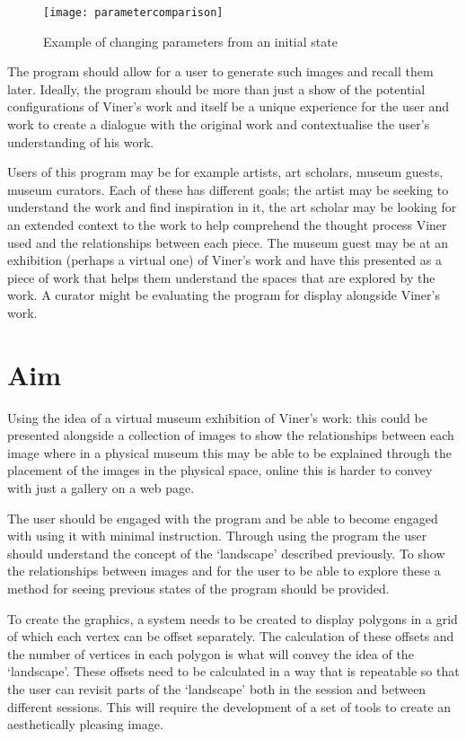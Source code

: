 \begin{figure}[H]
    \centering
    \texttt{[image: parametercomparison]}
    \caption{Example of changing parameters from an initial state}
\end{figure}

The program should allow for a user to generate such images and recall them
later. Ideally, the program should be more than just a show of the potential
configurations of Viner's work and itself be a unique experience for the user
and work to create a dialogue with the original work and contextualise the
user's understanding of his work.

Users of this program may be for example artists, art scholars, museum guests,
museum curators. Each of these has different goals; the artist may be seeking
to understand the work and find inspiration in it, the art scholar may be
looking for an extended context to the work to help comprehend the thought
process Viner used and the relationships between each piece. The museum guest may be
at an exhibition (perhaps a virtual one) of Viner's work and have this presented
as a piece of work that helps them understand the spaces that are explored by
the work. A curator might be evaluating the program for display alongside
Viner's work.

\section{Aim}
Using the idea of a virtual museum exhibition of Viner's work: this could be
presented alongside a collection of images to show the relationships between
each image where in a physical museum this may be able to be explained through
the placement of the images in the physical space, online this is harder to
convey with just a gallery on a web page.

The user should be engaged with the program and be able to become engaged with
using it with minimal instruction. Through using the program the user should
understand the concept of the `landscape' described previously. To show the
relationships between images and for the user to be able to explore these a
method for seeing previous states of the program should be provided.

To create the graphics, a system needs to be created to display polygons in a
grid of which each vertex can be offset separately. The calculation of these
offsets and the number of vertices in each polygon is what will convey the idea
of the `landscape'. These offsets need to be calculated in a way that is
repeatable so that the user can revisit parts of the `landscape' both in the
session and between different sessions. This will require the development of a
set of tools to create an aesthetically pleasing image.

